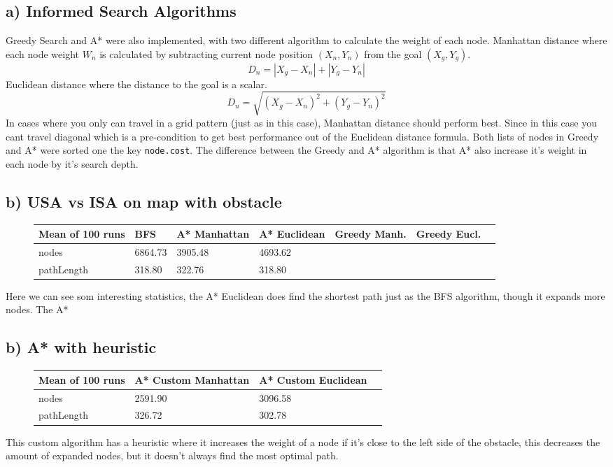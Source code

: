 \documentclass{article}
\begin{document}
\subsection{a) Informed Search Algorithms}
Greedy Search and A* were also implemented, with two different algorithm to calculate the weight of each node.
Manhattan distance where each node weight $W_n$ is calculated by subtracting current node position $(X_n, Y_n)$ from the goal $(X_g, Y_g)$.
\begin{equation}
    D_n = |X_g - X_n| + |Y_g - Y_n|
\end{equation}
Euclidean distance where the distance to the goal is a scalar.
\begin{equation}
   D_n = \sqrt{(X_g - X_n)^2 + (Y_g - Y_n)^2}
\end{equation}
In cases where you only can travel in a grid pattern (just as in this case), Manhattan distance should perform best.
Since in this case you cant travel diagonal which is a pre-condition to get best performance out of the Euclidean distance formula.  
Both lists of nodes in Greedy and A* were sorted one the key \texttt{node.cost}. The difference between the Greedy and A*
algorithm is that A* also increase it's weight in each node by it's search depth.
\subsection{b) USA vs ISA on map with obstacle}
\begin{figure}[H]
    \center
    \begin{tabular}{llllllr}
        \toprule
        {Mean of 100 runs} & {BFS} & {A* Manhattan} & {A* Euclidean} & {Greedy Manh.} & {Greedy Eucl.} \\
        \midrule
        nodes      &  6864.73 &  3905.48 &  4693.62 \\
        pathLength &   318.80 &   322.76 &   318.80 \\
        \bottomrule  
    \end{tabular}
\end{figure}
Here we can see som interesting statistics, the A* Euclidean does find the shortest path just as the BFS algorithm, 
though it expands more nodes. The A*
\subsection{b) A* with heuristic}
\begin{figure}[H]
    \center
    \begin{tabular}{lllr}
        \toprule
        {Mean of 100 runs} & {A* Custom Manhattan} & {A* Custom Euclidean} \\
        \midrule
        nodes      &  2591.90 &  3096.58 \\
        pathLength &   326.72 &   302.78 \\
        \bottomrule  
    \end{tabular}
\end{figure}
This custom algorithm has a heuristic where it increases the weight of a node if it's close to the left side of 
the obstacle, this decreases the amount of expanded nodes, but it doesn't always find the most optimal path.
\end{document}
